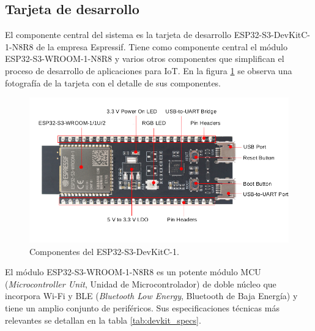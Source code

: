 \subsection{Tarjeta de desarrollo}
El componente central del sistema es la tarjeta de desarrollo ESP32-S3-DevKitC-1-N8R8 de la empresa Espressif. Tiene como componente central el módulo ESP32-S3-WROOM-1-N8R8 y varios otros componentes que simplifican el proceso de desarrollo de aplicaciones para IoT. En la figura \ref{fig:devkit_comp} se observa una fotografía de la tarjeta con el detalle de sus componentes.

\begin{figure}[h]
	\centering
	\includegraphics[scale=0.45]{./Figures/devkit_comp.png}
	\caption{Componentes del ESP32-S3-DevKitC-1\protect\footnotemark.}
	\label{fig:devkit_comp}
\end{figure}

El módulo ESP32-S3-WROOM-1-N8R8 es un potente módulo MCU (\textit{Microcontroller Unit}, Unidad de Microcontrolador) de doble núcleo que incorpora Wi-Fi y BLE (\textit{Bluetooth Low Energy}, Bluetooth de Baja Energía) y tiene un amplio conjunto de periféricos. Sus especificaciones técnicas más relevantes se detallan en la tabla \ref{tab:devkit_specs}.


